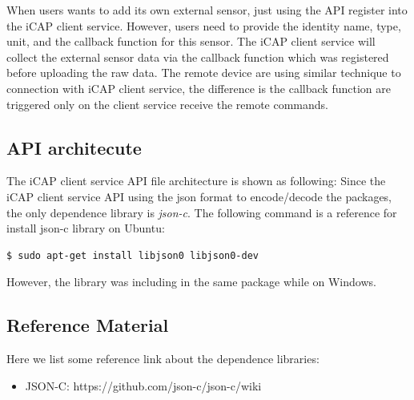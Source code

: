 When users wants to add its own external sensor, just using the API register into the iCAP client service.
However, users need to provide the identity name, type, unit, and the callback function for this sensor.
The iCAP client service will collect the external sensor data via the callback function which was registered before uploading the raw data.
The remote device are using similar technique to connection with iCAP client service, the difference is the callback function are triggered only on the client service receive the remote commands.

\subsection{API architecute}
The iCAP client service API file architecture is shown as following:
\setlength{\DTbaselineskip}{20pt}
\DTsetlength{1em}{3em}{0.5em}{2pt}{4pt}
Since the iCAP client service API using the json format to encode/decode the packages, the only dependence library is {\em json-c}.
The following command is a reference for install json-c library on Ubuntu:
\begin{lstlisting}[language=bash,frame=single]
$ sudo apt-get install libjson0 libjson0-dev
\end{lstlisting}
However, the library was including in the same package while on Windows.

\subsection{Reference Material}
Here we list some reference link about the dependence libraries:
\begin{itemize}
	\item JSON-C: https://github.com/json-c/json-c/wiki
\end{itemize}